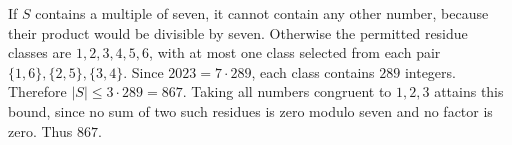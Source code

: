 If $S$ contains a multiple of seven, it cannot contain any other number, because their product would be divisible by seven. Otherwise the permitted residue classes are $1,2,3,4,5,6$, with at most one class selected from each pair $\{1,6\},\{2,5\},\{3,4\}$. Since $2023=7\cdot289$, each class contains $289$ integers. Therefore $|S|\le3\cdot289=867$. Taking all numbers congruent to $1,2,3$ attains this bound, since no sum of two such residues is zero modulo seven and no factor is zero. Thus $\boxed{867}$.
